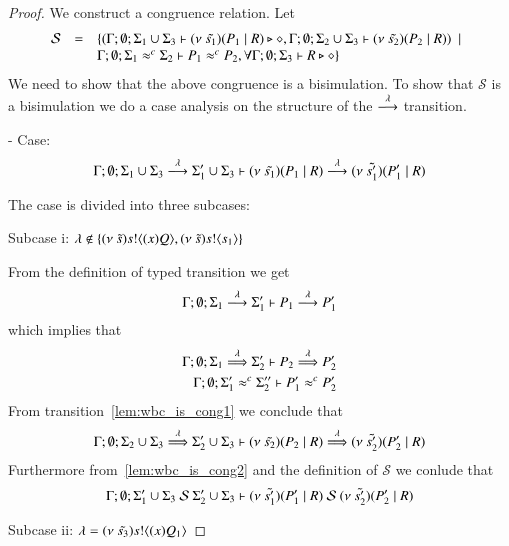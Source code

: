 \begin{proof}
	\noi We construct a congruence relation. Let
	\[
	\begin{array}{rcl}
		\mathcal{S} &=&	\{(\Gamma; \emptyset; \Sigma_1 \cup \Sigma_3 \vdash (\nu\ \tilde{s_1})(P_1 \;|\; R) \triangleright \diamond, \Gamma; \emptyset; \Sigma_2 \cup \Sigma_3 \vdash (\nu\ \tilde{s_2})(P_2 \;|\; R)) \ \ |\ \  \\
		& &	\Gamma;\emptyset;\Sigma_1 \approx^{c} \Sigma_2 \vdash P_1 \approx^{c} P_2, \forall \Gamma; \emptyset; \Sigma_3 \vdash R \triangleright \diamond\}
	\end{array}
	\]
	\noi We need to show that the above congruence is a bisimulation.
	To show that $\mathcal{S}$ is a bisimulation we do a case analysis on the structure
	of the $\stackrel{\lambda}{\longrightarrow}$ transition.


	\noi - Case: 
	\[
		\Gamma; \emptyset; \Sigma_1 \cup \Sigma_3 \stackrel{\lambda}{\longrightarrow} \Sigma_1' \cup \Sigma_3 \vdash (\nu\ \tilde{s_1})(P_1 \;|\; R) \stackrel{\lambda}{\longrightarrow} (\nu\ \tilde{s_1'})(P_1' \;|\; R)
	\]

	\noi The case is divided into three subcases:

	\noi Subcase i: $\lambda \notin \{(\nu\ \tilde{s}) s ! \langle (x)Q \rangle, (\nu\ \tilde{s}) s ! \langle s_1 \rangle\}$

	\noi From the definition of typed transition we get
	\[
		\Gamma; \emptyset; \Sigma_1 \stackrel{\lambda}{\longrightarrow} \Sigma_1' \vdash P_1 \stackrel{\lambda}{\longrightarrow} P_1'
	\]
	\noi which implies that
%
	\begin{eqnarray}
		\Gamma; \emptyset; \Sigma_1 \stackrel{\lambda}{\Longrightarrow} \Sigma_2' \vdash P_2 \stackrel{\lambda}{\Longrightarrow} P_2' \label{lem:wbc_is_cong1}\\
		\Gamma; \emptyset; \Sigma_1' \approx^{c} \Sigma_2'' \vdash P_1' \approx^{c} P_2' \label{lem:wbc_is_cong2}
	\end{eqnarray}
%
	\noi From transition~\ref{lem:wbc_is_cong1} we conclude that 
	\[
		\Gamma;\emptyset; \Sigma_2 \cup \Sigma_3 \stackrel{\lambda}{\Longrightarrow} \Sigma_2' \cup \Sigma_3 \vdash (\nu\ \tilde{s_2})(P_2 \;|\; R) \stackrel{\lambda}{\Longrightarrow} (\nu\ \tilde{s_2'})(P_2' \;|\; R)
	\]
%
	\noi Furthermore from~\ref{lem:wbc_is_cong2} and the definition of $\mathcal{S}$ we conlude that
	\[
		\Gamma; \emptyset; \Sigma_1' \cup \Sigma_3\ \mathcal{S}\ \Sigma_2' \cup \Sigma_3 \proves \newsp{\tilde{s_1'}}{P_1' \Par R}\ \mathcal{S}\ \newsp{\tilde{s_2'}}{P_2' \Par R}
	\]

	\noi Subcase ii: $\lambda = (\nu\ \tilde{s_3}) s ! \langle (x)Q_1 \rangle$


\end{proof}
